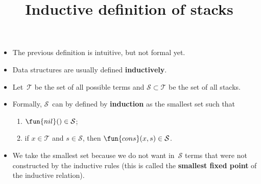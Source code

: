 \documentclass[wide]{slides}
\begin{document}
\begin{slide}
  \title{Inductive definition of stacks}

  \begin{itemize}

    \item The previous definition is intuitive, but not formal yet.

    \item Data structures are usually defined \textbf{inductively}.

    \item Let~\(\mathcal{T}\) be the set of all possible terms and
      \(\mathcal{S} \subset \mathcal{T}\) be the set of all stacks.

    \item Formally, \(\mathcal{S}\)~can by defined by
      \textbf{induction} as the smallest set such that
      \begin{enumerate}

        \item \(\fun{nil}() \in \mathcal{S}\);

        \item if \(x \in \mathcal{T}\) and \(s \in \mathcal{S}\), then
          \(\fun{cons}(x,s) \in \mathcal{S}\).
      \end{enumerate}

    \item We take the smallest set because we do not want
      in~\(\mathcal{S}\) terms that were not constructed by the
      inductive rules (this is called the \textbf{smallest fixed
        point} of the inductive relation).

  \end{itemize}

\end{slide}
\end{document}
